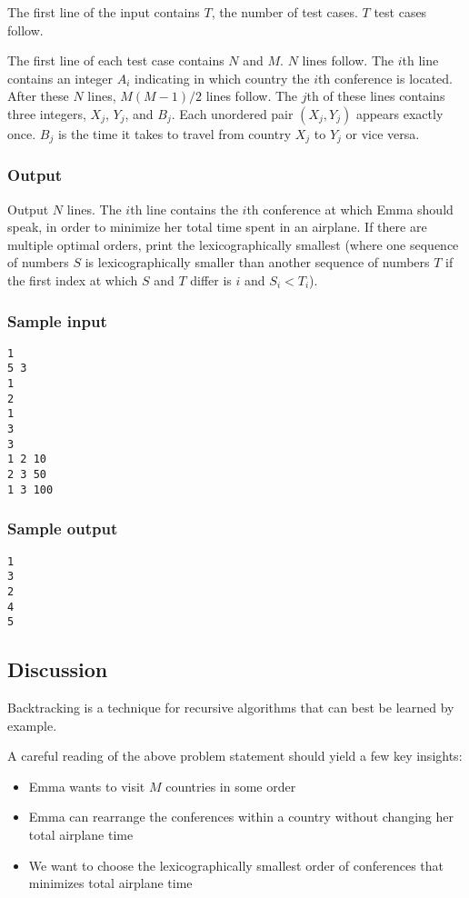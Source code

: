 The first line of the input contains $T$, the number of test cases. $T$ test cases follow.

The first line of each test case contains $N$ and $M$. $N$ lines follow. The $i$th line contains an integer $A_i$ indicating in which country the $i$th conference is located. After these $N$ lines, $M(M - 1) / 2$ lines follow. The $j$th of these lines contains three integers, $X_j$, $Y_j$, and $B_j$. Each unordered pair $(X_j, Y_j)$ appears exactly once. $B_j$ is the time it takes to travel from country $X_j$ to $Y_j$ or vice versa.

\subsubsection*{Output}

Output $N$ lines. The $i$th line contains the $i$th conference at which Emma should speak, in order to minimize her total time spent in an airplane. If there are multiple optimal orders, print the lexicographically smallest (where one sequence of numbers $S$ is lexicographically smaller than another sequence of numbers $T$ if the first index at which $S$ and $T$ differ is $i$ and $S_i < T_i$).

\subsubsection*{Sample input}

\begin{verbatim}
1
5 3
1
2
1
3
3
1 2 10
2 3 50
1 3 100
\end{verbatim}

\subsubsection*{Sample output}

\begin{verbatim}
1
3
2
4
5
\end{verbatim}

\subsection*{Discussion}

Backtracking is a technique for recursive algorithms that can best be learned by example.

A careful reading of the above problem statement should yield a few key insights:

\begin{itemize}
\item Emma wants to visit $M$ countries in some order
\item Emma can rearrange the conferences within a country without changing her total airplane time
\item We want to choose the lexicographically smallest order of conferences that minimizes total airplane time
\end{itemize}

